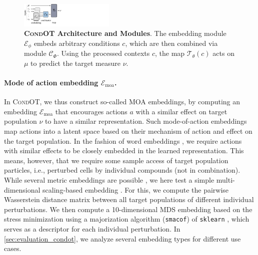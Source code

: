 \begin{figure}
    \centering
    \includegraphics[width=0.4\textwidth]{figures/fig_architecture.pdf}
    \caption{\textbf{\textsc{CondOT} Architecture and Modules}. The embedding module $\mathcal{E}_\phi$ embeds arbitrary conditions $c$, which are then combined via module $\mathcal{C}_\Phi$. Using the processed contexts $c$, the map $\mathcal{T}_\theta(c)$ acts on $\mu$ to predict the target measure $\nu$. \vspace{-10pt}}
    \label{fig:architecture}
\end{figure}

\paragraph{Mode of action embedding $\mathcal{E}_\text{moa}$.}
In \textsc{CondOT}, we thus construct so-called \acrfull{MOA} embeddings, by computing an embedding $\mathcal{E}_\text{moa}$ that encourages actions $a$ with a similar effect on target population $\nu$ to have a similar representation.
Such mode-of-action embeddings map actions into a latent space based on their mechanism of action and effect on the target population.
In the fashion of word embeddings \citep{mikolov2013efficient, mikolov2013distributed, mikolov2013linguistic}, we require actions with similar effects to be closely embedded in the learned representation.
This means, however, that we require some sample access of target population particles, i.e., perturbed cells by individual compounds (not in combination).
While several metric embeddings are possible \citep{chopra2005learning}, we here test a simple multi-dimensional scaling-based embedding \citep{mead1992review}.
For this, we compute the pairwise Wasserstein distance matrix between all target populations of different individual perturbations. We then compute a 10-dimensional MDS embedding based on the stress minimization using a majorization algorithm (\texttt{smacof}) \citep{de2009multidimensional} of \texttt{sklearn} \citep{pedregosa2011scikit}, which serves as a descriptor for each individual perturbation.
In \cref{sec:evaluation_condot}, we analyze several embedding types for different use cases.

